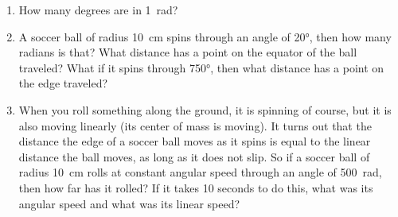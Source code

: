 \begin{enumerate}
%	
%	
%	
%	
%	
%	
	
	\item How many degrees are in \SI{1}{\radian}?
	\item A soccer ball of radius \SI{10}{cm} spins through an angle of \ang{20}, then how many radians is that? What distance has a point on the equator of the ball traveled? What if it spins through \ang{750}, then what distance has a point on the edge traveled?
	
	\item When you roll something along the ground, it is spinning of course, but it is also moving linearly (its center of mass is moving). It turns out that the distance the edge of a soccer ball moves as it spins is equal to the linear distance the ball moves, as long as it does not slip. So if a soccer ball of radius \SI{10}{cm} rolls at constant angular speed through an angle of \SI{500}{\radian}, then how far has it rolled? If it takes 10 seconds to do this, what was its angular speed and what was its linear speed?
	

\end{enumerate}
